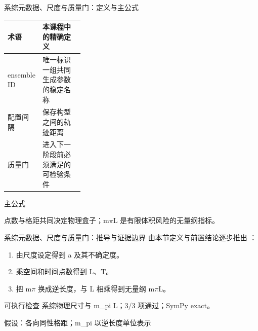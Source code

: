 \begin{frame}[t]{系综元数据、尺度与质量门：定义与主公式}
\footnotesize\begin{tabularx}{\linewidth}{p{0.30\linewidth}Y}
\toprule 术语 & 本课程中的精确定义\\\midrule
{} ensemble ID & 唯一标识一组共同生成参数的稳定名称\\
 配置间隔 & 保存构型之间的轨迹距离\\
 质量门 & 进入下一阶段前必须满足的可检验条件\\
\bottomrule\end{tabularx}\vspace{0.15cm}
\begin{block}{ 主公式}\centering{}\end{block}
点数与格距共同决定物理盒子；m\ensuremath{\pi}L 是有限体积风险的无量纲指标。
\end{frame}

\begin{frame}[t]{系综元数据、尺度与质量门：推导与证据边界}
\footnotesize
{}\quad 由本节定义与前置结论逐步推出 ：
\begin{enumerate}
\item 由尺度设定得到 a 及其不确定度。
\item 乘空间和时间点数得到 L、T。
\item 把 m\ensuremath{\pi} 换成逆长度，与 L 相乘得到无量纲 m\ensuremath{\pi}L。
\end{enumerate}\begin{block}{可执行检查}
\quad 系综物理尺寸与 m\_pi L；3/3 项通过；SymPy exact。
\par\scriptsize 假设：各向同性格距；m\_pi 以逆长度单位表示
\end{block}
\end{frame}

